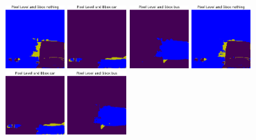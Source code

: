 \begin{figure}[h!]
  \centering
  \includegraphics[width=0.2\textwidth]{../../modelos-entrenados/unet-nonlocal/ejecucion4/predvalmid0}
  \vrule
  \includegraphics[width=0.2\textwidth]{../../modelos-entrenados/unet-nonlocal/ejecucion4/predvalmid2}
  \vrule
  \includegraphics[width=0.2\textwidth]{../../modelos-entrenados/unet-nonlocal/ejecucion4/predvalmid5}
  \newline
  \includegraphics[width=0.2\textwidth]{../../modelos-entrenados/unet-nonlocal/ejecucion5/predvalmid0}
  \vrule
  \includegraphics[width=0.2\textwidth]{../../modelos-entrenados/unet-nonlocal/ejecucion5/predvalmid2}
  \vrule
  \includegraphics[width=0.2\textwidth]{../../modelos-entrenados/unet-nonlocal/ejecucion5/predvalmid5}

\end{figure}

